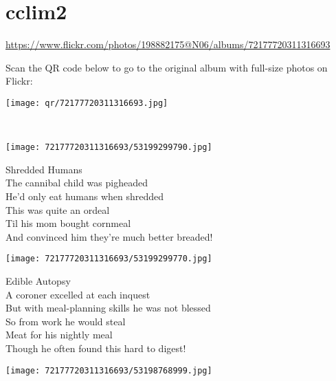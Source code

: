 \documentclass[10pt,letterpaper]{article}
\title{}
\author{}
\date{}
\begin{document}
\section*{cclim2}

\url{https://www.flickr.com/photos/198882175@N06/albums/72177720311316693}

Scan the QR code below to go to the original album with full-size photos on Flickr:

\begin{center}
\texttt{[image: qr/72177720311316693.jpg]}
\end{center}
\pagebreak
\newpage

\ %

\newpage

\begin{center}\texttt{[image: 72177720311316693/53199299790.jpg]}
\end{center}
\begin{center}
Shredded Humans\\
\vskip 0.2in
The cannibal child was pigheaded\\
He'd only eat humans when shredded\\
This was quite an ordeal\\
Til his mom bought cornmeal\\
And convinced him they're much better breaded!\\
\end{center}
\pagebreak

\begin{center}
\texttt{[image: 72177720311316693/53199299770.jpg]}
\end{center}

\begin{center}
Edible Autopsy\\
\vskip 0.2in
A coroner excelled at each inquest\\
But with meal-planning skills he was not blessed\\
So from work he would steal\\
Meat for his nightly meal\\
Though he often found this hard to digest!\\
\end{center}
\pagebreak

\begin{center}
\texttt{[image: 72177720311316693/53198768999.jpg]}
\end{center}
\end{document}
